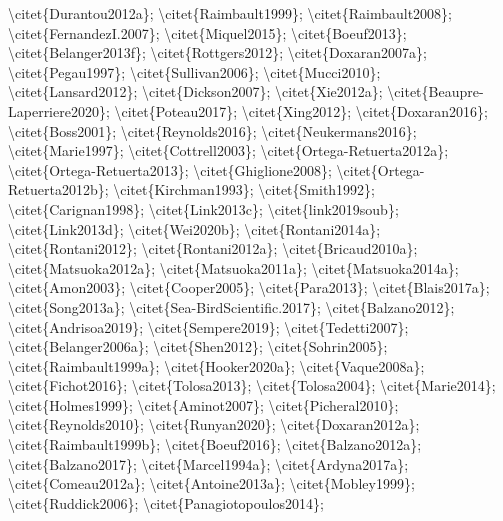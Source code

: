 \begingroup\fontsize{4}{6}\selectfont

\begin{ThreePartTable}
\begin{TableNotes}
\item \textbackslash{}citet\{Durantou2012a\}; \textbackslash{}citet\{Raimbault1999\}; \textbackslash{}citet\{Raimbault2008\}; \textbackslash{}citet\{FernandezI.2007\}; \textbackslash{}citet\{Miquel2015\}; \textbackslash{}citet\{Boeuf2013\}; \textbackslash{}citet\{Belanger2013f\}; \textbackslash{}citet\{Rottgers2012\}; \textbackslash{}citet\{Doxaran2007a\}; \textbackslash{}citet\{Pegau1997\}; \textbackslash{}citet\{Sullivan2006\}; \textbackslash{}citet\{Mucci2010\}; \textbackslash{}citet\{Lansard2012\}; \textbackslash{}citet\{Dickson2007\}; \textbackslash{}citet\{Xie2012a\}; \textbackslash{}citet\{Beaupre-Laperriere2020\}; \textbackslash{}citet\{Poteau2017\}; \textbackslash{}citet\{Xing2012\}; \textbackslash{}citet\{Doxaran2016\}; \textbackslash{}citet\{Boss2001\}; \textbackslash{}citet\{Reynolds2016\}; \textbackslash{}citet\{Neukermans2016\}; \textbackslash{}citet\{Marie1997\}; \textbackslash{}citet\{Cottrell2003\}; \textbackslash{}citet\{Ortega-Retuerta2012a\}; \textbackslash{}citet\{Ortega-Retuerta2013\}; \textbackslash{}citet\{Ghiglione2008\}; \textbackslash{}citet\{Ortega-Retuerta2012b\}; \textbackslash{}citet\{Kirchman1993\}; \textbackslash{}citet\{Smith1992\}; \textbackslash{}citet\{Carignan1998\}; \textbackslash{}citet\{Link2013c\}; \textbackslash{}citet\{link2019soub\}; \textbackslash{}citet\{Link2013d\}; \textbackslash{}citet\{Wei2020b\}; \textbackslash{}citet\{Rontani2014a\}; \textbackslash{}citet\{Rontani2012\}; \textbackslash{}citet\{Rontani2012a\}; \textbackslash{}citet\{Bricaud2010a\}; \textbackslash{}citet\{Matsuoka2012a\}; \textbackslash{}citet\{Matsuoka2011a\}; \textbackslash{}citet\{Matsuoka2014a\}; \textbackslash{}citet\{Amon2003\}; \textbackslash{}citet\{Cooper2005\}; \textbackslash{}citet\{Para2013\}; \textbackslash{}citet\{Blais2017a\}; \textbackslash{}citet\{Song2013a\}; \textbackslash{}citet\{Sea-BirdScientific.2017\}; \textbackslash{}citet\{Balzano2012\}; \textbackslash{}citet\{Andrisoa2019\}; \textbackslash{}citet\{Sempere2019\}; \textbackslash{}citet\{Tedetti2007\}; \textbackslash{}citet\{Belanger2006a\}; \textbackslash{}citet\{Shen2012\}; \textbackslash{}citet\{Sohrin2005\}; \textbackslash{}citet\{Raimbault1999a\}; \textbackslash{}citet\{Hooker2020a\}; \textbackslash{}citet\{Vaque2008a\}; \textbackslash{}citet\{Fichot2016\}; \textbackslash{}citet\{Tolosa2013\}; \textbackslash{}citet\{Tolosa2004\}; \textbackslash{}citet\{Marie2014\}; \textbackslash{}citet\{Holmes1999\}; \textbackslash{}citet\{Aminot2007\}; \textbackslash{}citet\{Picheral2010\}; \textbackslash{}citet\{Reynolds2010\}; \textbackslash{}citet\{Runyan2020\}; \textbackslash{}citet\{Doxaran2012a\}; \textbackslash{}citet\{Raimbault1999b\}; \textbackslash{}citet\{Boeuf2016\}; \textbackslash{}citet\{Balzano2012a\}; \textbackslash{}citet\{Balzano2017\}; \textbackslash{}citet\{Marcel1994a\}; \textbackslash{}citet\{Ardyna2017a\}; \textbackslash{}citet\{Comeau2012a\}; \textbackslash{}citet\{Antoine2013a\}; \textbackslash{}citet\{Mobley1999\}; \textbackslash{}citet\{Ruddick2006\}; \textbackslash{}citet\{Panagiotopoulos2014\}; 
\end{TableNotes}
\end{ThreePartTable}
